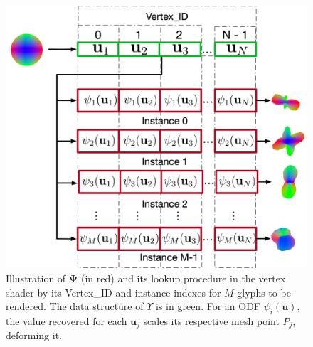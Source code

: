 \documentclass[twoside,twocolumn,10pt]{article}
\begin{document}
\begin{figure}[htb]
    \centering
    \includegraphics[width=1.0\linewidth, angle=0]{figs/rendering_scheme/GPU2Glyph.png}
    \caption{
    Illustration of $\bm{\Psi}$ (in red) and its lookup procedure in the vertex shader by its Vertex\_ID and instance indexes for $M$ glyphs to be rendered. The data structure of $\Upsilon$ is in green. For an ODF $\psi_i(\bm{u})$, the value recovered for each $\mathbf{u}_j$ scales its respective mesh point $P_j$, deforming it.
    }
    \label{fig::GPU2glyph}
\end{figure}
\end{document}
